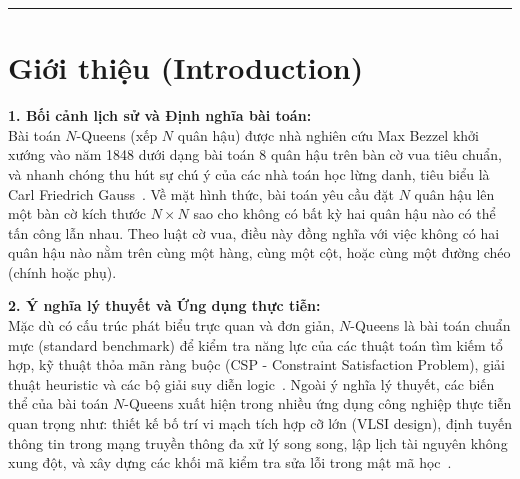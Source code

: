 \documentclass[11pt,a4paper]{article}
\begin{document}
\vspace{1em}
\hrule
\vspace{1.5em}

\section{Giới thiệu (Introduction)}

\noindent\textbf{1. Bối cảnh lịch sử và Định nghĩa bài toán:}\\
Bài toán $N$-Queens (xếp $N$ quân hậu) được nhà nghiên cứu Max Bezzel khởi xướng vào năm 1848 dưới dạng bài toán 8 quân hậu trên bàn cờ vua tiêu chuẩn, và nhanh chóng thu hút sự chú ý của các nhà toán học lừng danh, tiêu biểu là Carl Friedrich Gauss~\cite{bell2009survey}. Về mặt hình thức, bài toán yêu cầu đặt $N$ quân hậu lên một bàn cờ kích thước $N \times N$ sao cho không có bất kỳ hai quân hậu nào có thể tấn công lẫn nhau. Theo luật cờ vua, điều này đồng nghĩa với việc không có hai quân hậu nào nằm trên cùng một hàng, cùng một cột, hoặc cùng một đường chéo (chính hoặc phụ).

\noindent\textbf{2. Ý nghĩa lý thuyết và Ứng dụng thực tiễn:}\\
Mặc dù có cấu trúc phát biểu trực quan và đơn giản, $N$-Queens là bài toán chuẩn mực (standard benchmark) để kiểm tra năng lực của các thuật toán tìm kiếm tổ hợp, kỹ thuật thỏa mãn ràng buộc (CSP - Constraint Satisfaction Problem), giải thuật heuristic và các bộ giải suy diễn logic~\cite{rossi2006handbook}. Ngoài ý nghĩa lý thuyết, các biến thể của bài toán $N$-Queens xuất hiện trong nhiều ứng dụng công nghiệp thực tiễn quan trọng như: thiết kế bố trí vi mạch tích hợp cỡ lớn (VLSI design), định tuyến thông tin trong mạng truyền thông đa xử lý song song, lập lịch tài nguyên không xung đột, và xây dựng các khối mã kiểm tra sửa lỗi trong mật mã học~\cite{bell2009survey}.
\end{document}
